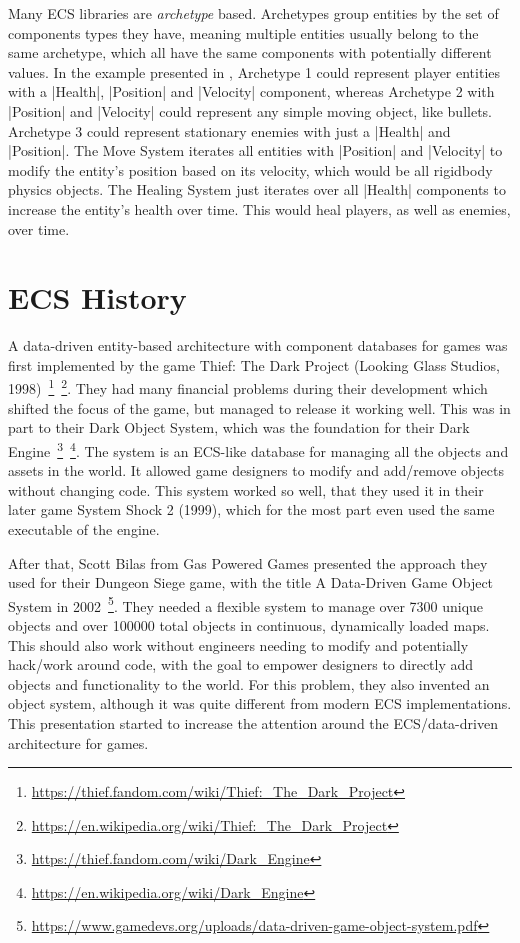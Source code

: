 Many ECS libraries are \textit{archetype} based. Archetypes group entities by the set of components types they have, meaning multiple entities usually belong to the same archetype, which all have the same components with potentially different values. In the example presented in , \textsf{Archetype 1} could represent player entities with a |Health|, |Position| and |Velocity| component, whereas \textsf{Archetype 2} with |Position| and |Velocity| could represent any simple moving object, like bullets. \textsf{Archetype 3} could represent stationary enemies with just a |Health| and |Position|. The \textsf{Move System} iterates all entities with |Position| and |Velocity| to modify the entity's position based on its velocity, which would be all rigidbody physics objects. The \textsf{Healing System} just iterates over all |Health| components to increase the entity's health over time. This would heal players, as well as enemies, over time.

\section{ECS History}

A data-driven entity-based architecture with component databases for games was first implemented by the game \textsf{Thief: The Dark Project} (Looking Glass Studios, 1998)~\footnote{\url{https://thief.fandom.com/wiki/Thief:_The_Dark_Project}}~\footnote{\url{https://en.wikipedia.org/wiki/Thief:_The_Dark_Project}}. They had many financial problems during their development which shifted the focus of the game, but managed to release it working well. This was in part to their \textsf{Dark Object System}, which was the foundation for their \textsf{Dark Engine}~\footnote{\url{https://thief.fandom.com/wiki/Dark_Engine}}~\footnote{\url{https://en.wikipedia.org/wiki/Dark_Engine}}. The system is an ECS-like database for managing all the objects and assets in the world. It allowed game designers to modify and add/remove objects without changing code. This system worked so well, that they used it in their later game \textsf{System Shock 2} (1999), which for the most part even used the same executable of the engine.

After that, Scott Bilas from \textsf{Gas Powered Games} presented the approach they used for their \textsf{Dungeon Siege} game, with the title \textsf{A Data-Driven Game Object System} in 2002~\footnote{\url{https://www.gamedevs.org/uploads/data-driven-game-object-system.pdf}}. They needed a flexible system to manage over 7300 unique objects and over 100000 total objects in continuous, dynamically loaded maps. This should also work without engineers needing to modify and potentially hack/work around code, with the goal to empower designers to directly add objects and functionality to the world. For this problem, they also invented an object system, although it was quite different from modern ECS implementations. This presentation started to increase the attention around the ECS/data-driven architecture for games.

